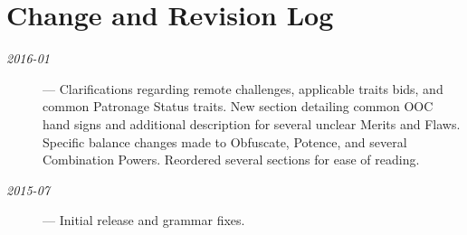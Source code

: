 \section{Change and Revision Log}
\begin{description}
	\item[\emph{2016-01}] --- Clarifications regarding remote challenges, applicable traits bids, and common Patronage Status traits. 
	New section detailing common OOC hand signs and additional description for several unclear Merits and Flaws. 
	Specific balance changes made to Obfuscate, Potence, and several Combination Powers. 
	Reordered several sections for ease of reading.
	\item[\emph{2015-07}] --- Initial release and grammar fixes.
\end{description}
